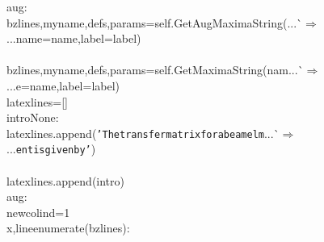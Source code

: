 {{\begin{tabbing}
\hspace{5pt}aug:
\\
\hspace{60pt}bzlines,myname,\hspace{5pt}defs,\hspace{5pt}params=self.GetAugMaximaString({}...\`$\Rightarrow$\\
...{}name=name,label=label)
\\
\\
\hspace{60pt}bzlines,myname,\hspace{5pt}defs,\hspace{5pt}params=self.GetMaximaString(nam{}...\`$\Rightarrow$\\
...{}e=name,label=label)
\\
\hspace{40pt}latexlines={[}{]}
\\
\hspace{5pt}intro\hspace{5pt}None:
\\
\hspace{60pt}latexlines.append({\texttt{{'}The\hspace{5pt}transfer\hspace{5pt}matrix\hspace{5pt}for\hspace{5pt}a\hspace{5pt}beam\hspace{5pt}elm}}{}...\`$\Rightarrow$\\
...{}{\texttt{ent\hspace{5pt}is\hspace{5pt}given\hspace{5pt}by{'}}})
\\
\\
\hspace{60pt}latexlines.append(intro)
\\
\hspace{5pt}aug:
\\
\hspace{60pt}newcolind=\dash{}1
\\
\hspace{5pt}x,line\hspace{5pt}enumerate(bzlines):

\end{tabbing}}}
